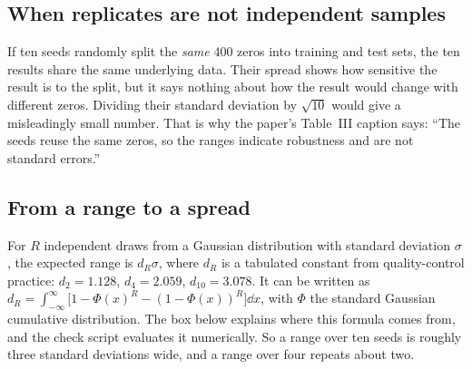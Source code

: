 \subsection{When replicates are not independent samples}

If ten seeds randomly split the \emph{same} 400 zeros into training and test sets, the ten results share the same underlying data. Their spread shows how sensitive the result is to the split, but it says nothing about how the result would change with different zeros. Dividing their standard deviation by $\sqrt{10}$ would give a misleadingly small number. That is why the paper's Table~III caption says: ``The seeds reuse the same zeros, so the ranges indicate robustness and are not standard errors.''

\subsection{From a range to a spread}

For $R$ independent draws from a Gaussian distribution with standard deviation $\sigma$, the expected range is $d_R\sigma$, where $d_R$ is a tabulated constant from quality-control practice: $d_2=1.128$, $d_4=2.059$, $d_{10}=3.078$. It can be written as $d_R=\int_{-\infty}^{\infty}\big[1-\Phi(x)^R-(1-\Phi(x))^R\big]\dd x$, with $\Phi$ the standard Gaussian cumulative distribution. The box below explains where this formula comes from, and the check script evaluates it numerically. So a range over ten seeds is roughly three standard deviations wide, and a range over four repeats about two.

